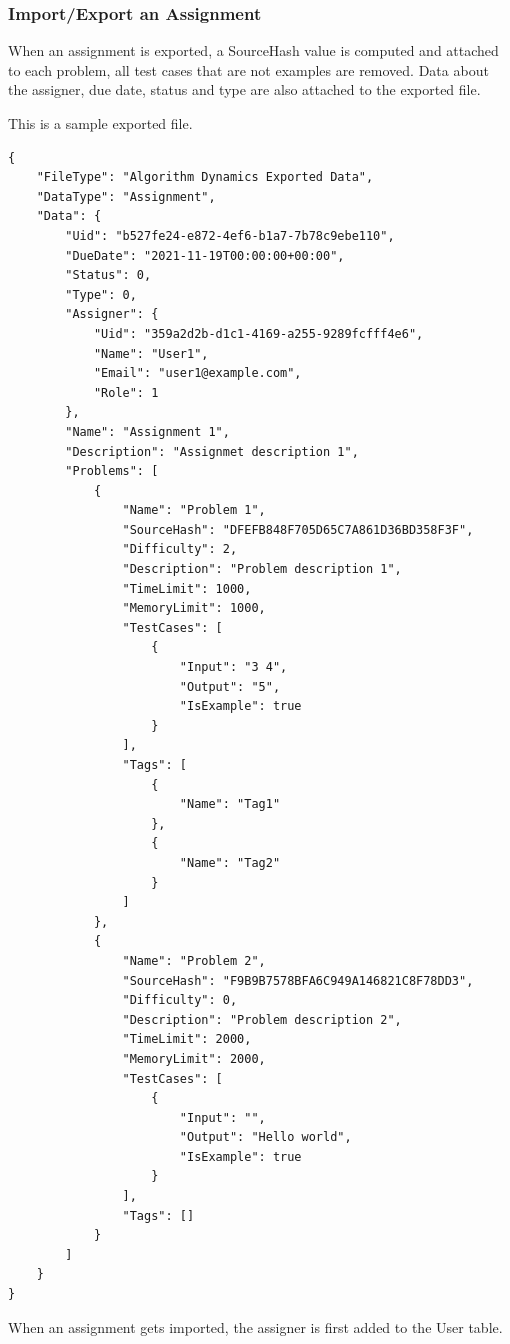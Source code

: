 \documentclass[a4paper]{report}
\begin{document}
\subsubsection{Import/Export an Assignment}

When an assignment is exported, a SourceHash value is computed and attached to each problem, all test cases that are not examples are removed. Data about the assigner, due date, status and type are also attached to the exported file.

This is a sample exported file.

\begin{verbatim}
{
    "FileType": "Algorithm Dynamics Exported Data",
    "DataType": "Assignment",
    "Data": {
        "Uid": "b527fe24-e872-4ef6-b1a7-7b78c9ebe110",
        "DueDate": "2021-11-19T00:00:00+00:00",
        "Status": 0,
        "Type": 0,
        "Assigner": {
            "Uid": "359a2d2b-d1c1-4169-a255-9289fcfff4e6",
            "Name": "User1",
            "Email": "user1@example.com",
            "Role": 1
        },
        "Name": "Assignment 1",
        "Description": "Assignmet description 1",
        "Problems": [
            {
                "Name": "Problem 1",
                "SourceHash": "DFEFB848F705D65C7A861D36BD358F3F",
                "Difficulty": 2,
                "Description": "Problem description 1",
                "TimeLimit": 1000,
                "MemoryLimit": 1000,
                "TestCases": [
                    {
                        "Input": "3 4",
                        "Output": "5",
                        "IsExample": true
                    }
                ],
                "Tags": [
                    {
                        "Name": "Tag1"
                    },
                    {
                        "Name": "Tag2"
                    }
                ]
            },
            {
                "Name": "Problem 2",
                "SourceHash": "F9B9B7578BFA6C949A146821C8F78DD3",
                "Difficulty": 0,
                "Description": "Problem description 2",
                "TimeLimit": 2000,
                "MemoryLimit": 2000,
                "TestCases": [
                    {
                        "Input": "",
                        "Output": "Hello world",
                        "IsExample": true
                    }
                ],
                "Tags": []
            }
        ]
    }
}
\end{verbatim}

When an assignment gets imported, the assigner is first added to the User table.
\end{document}
